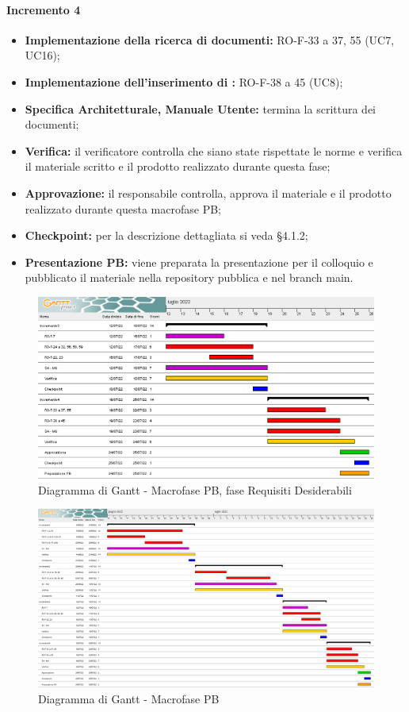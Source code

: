 \paragraph{Incremento 4}
\begin{itemize}
    \item \textbf{Implementazione della ricerca di documenti:} RO-F-33 a 37, 55 (UC7, UC16);
    \item \textbf{Implementazione dell'inserimento di :} RO-F-38 a 45 (UC8);
    \item \textbf{Specifica Architetturale, Manuale Utente:} termina la scrittura dei documenti;
    \item \textbf{Verifica:} il verificatore controlla che siano state rispettate le norme e verifica il materiale scritto e il prodotto realizzato durante questa fase;
    \item \textbf{Approvazione:} il responsabile controlla, approva il materiale e il prodotto realizzato durante questa macrofase PB;
    \item \textbf{Checkpoint:} per la descrizione dettagliata si veda §4.1.2;
    \item \textbf{Presentazione PB:} viene preparata la presentazione per il colloquio e pubblicato il materiale nella repository pubblica e nel branch main.
\end{itemize}

\begin{landscape}
	\begin{figure}
	\includegraphics[width=\linewidth]{images/PB_desiderabili.png}
    \caption{Diagramma di Gantt - Macrofase PB, fase Requisiti Desiderabili}
	\end{figure}
\end{landscape}

\begin{landscape}
	\begin{figure}
	\includegraphics[width=\linewidth]{images/PB.png}
    \caption{Diagramma di Gantt - Macrofase PB}
	\end{figure}
\end{landscape}

\newpage